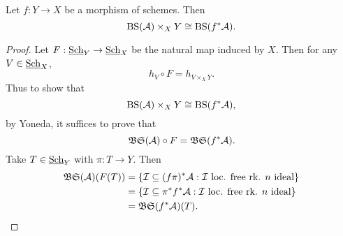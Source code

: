 \begin{lem}
Let $f: Y\rightarrow X$ be a morphism of schemes.  Then
$$\textnormal{BS}(\mathcal{A})\times_X Y\cong \textnormal{BS}(f^*\mathcal{A}).$$
\end{lem}
\begin{proof}
Let $F: \textnormal{\underline{Sch}}_Y\rightarrow\textnormal{\underline{Sch}}_X$ be the natural map induced by $X$.  Then for any $V\in\textnormal{\underline{Sch}}_X$,
$$h_V\circ F = h_{V\times_XY}.$$
Thus to show that
$$\textnormal{BS}(\mathcal{A})\times_X Y\cong \textnormal{BS}(f^*\mathcal{A}),$$
by Yoneda, it suffices to prove that
$$\mathfrak{BS}(\mathcal{A})\circ F = \mathfrak{BS}(f^*\mathcal{A}).$$
Take $T\in\textnormal{\underline{Sch}}_Y$ with $\pi: T\rightarrow Y$.  Then
\begin{align*}
\mathfrak{BS}(\mathcal{A})(F(T)) & = \{\mathcal{I}\subseteq (f\pi)^*\mathcal{A}: \mathcal{I}\ \text{loc. free rk. $n$ ideal}\}\\
                     & = \{\mathcal{I}\subseteq \pi^*f^*\mathcal{A}: \mathcal{I}\ \text{loc. free rk. $n$ ideal}\}\\
                     & = \mathfrak{BS}(f^*\mathcal{A})(T).
\end{align*}
\end{proof}

